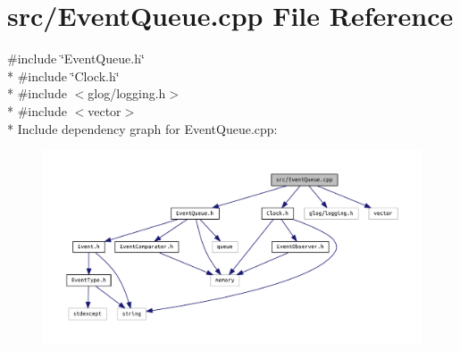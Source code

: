 \section{src/\+Event\+Queue.cpp File Reference}
\label{_event_queue_8cpp}
{\ttfamily \#include \char`\"{}Event\+Queue.\+h\char`\"{}}\\*
{\ttfamily \#include \char`\"{}Clock.\+h\char`\"{}}\\*
{\ttfamily \#include $<$glog/logging.\+h$>$}\\*
{\ttfamily \#include $<$vector$>$}\\*
Include dependency graph for Event\+Queue.\+cpp\+:
\nopagebreak
\begin{figure}[H]
\begin{center}
\leavevmode
\includegraphics[width=350pt]{_event_queue_8cpp__incl}
\end{center}
\end{figure}
